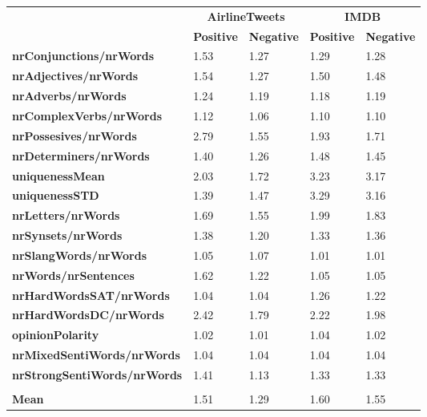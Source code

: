 \begin{tabular}{|l|l|l|l|l|} \cline{2-5}
\multicolumn{1}{c|}{} & \multicolumn{2}{c|}{\textbf{AirlineTweets}} & \multicolumn{2}{c|}{\textbf{IMDB}}\\ \cline{2-5}
\multicolumn{1}{c|}{} & \textbf{Positive} & \textbf{Negative} & \textbf{Positive} & \textbf{Negative} \\ \hline
\textbf{nrConjunctions/nrWords} & 1.53 & 1.27 & 1.29 & 1.28 \\ \hline
\textbf{nrAdjectives/nrWords} & 1.54 & 1.27 & 1.50 & 1.48 \\ \hline
\textbf{nrAdverbs/nrWords} & 1.24 & 1.19 & 1.18 & 1.19 \\ \hline
\textbf{nrComplexVerbs/nrWords} & 1.12 & 1.06 & 1.10 & 1.10 \\ \hline
\textbf{nrPossesives/nrWords} & 2.79 & 1.55 & 1.93 & 1.71 \\ \hline
\textbf{nrDeterminers/nrWords} & 1.40 & 1.26 & 1.48 & 1.45 \\ \hline
\textbf{uniquenessMean} & 2.03 & 1.72 & 3.23 & 3.17 \\ \hline
\textbf{uniquenessSTD} & 1.39 & 1.47 & 3.29 & 3.16 \\ \hline
\textbf{nrLetters/nrWords} & 1.69 & 1.55 & 1.99 & 1.83 \\ \hline
\textbf{nrSynsets/nrWords} & 1.38 & 1.20 & 1.33 & 1.36 \\ \hline
\textbf{nrSlangWords/nrWords} & 1.05 & 1.07 & 1.01 & 1.01 \\ \hline
\textbf{nrWords/nrSentences} & 1.62 & 1.22 & 1.05 & 1.05 \\ \hline
\textbf{nrHardWordsSAT/nrWords} & 1.04 & 1.04 & 1.26 & 1.22 \\ \hline
\textbf{nrHardWordsDC/nrWords} & 2.42 & 1.79 & 2.22 & 1.98 \\ \hline
\textbf{opinionPolarity} & 1.02 & 1.01 & 1.04 & 1.02 \\ \hline
\textbf{nrMixedSentiWords/nrWords} & 1.04 & 1.04 & 1.04 & 1.04 \\ \hline
\textbf{nrStrongSentiWords/nrWords} & 1.41 & 1.13 & 1.33 & 1.33\\ \hline
 \multicolumn{3}{c}{} \\ [-1.5ex] \hline
\textbf{{\scriptsize Mean}} & 1.51 & 1.29 & 1.60 & 1.55 \\ \hline
\end{tabular}